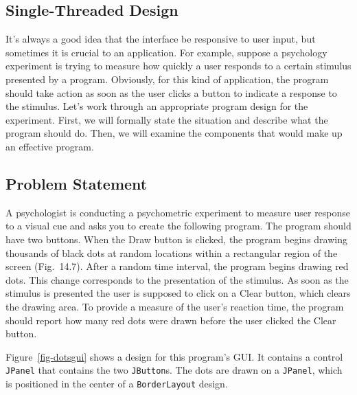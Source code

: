 \subsection{Single-Threaded Design}
\noindent It's always a good idea that the interface be responsive to
user input, but sometimes it is crucial to an application.  For
example, suppose a psychology experiment is trying to measure how
quickly a user responds to a certain stimulus presented by a program.
Obviously, for this kind of application, the program should take
action as soon as the user clicks a button to indicate a response to
the stimulus. Let's work through an appropriate program design for
the experiment. First, we will formally state the situation and
describe what the program should do.  Then, we will examine the
components that would make up an effective program.

\subsection*{Problem Statement}
\noindent A psychologist is conducting a psychometric experiment to measure user
response to a visual cue and asks you to create the following
program.  The program should have two buttons.  When the Draw button
is clicked, the program begins drawing thousands of black dots at
random locations within a rectangular region of the screen
(Fig.~14.7).  After a random time interval, the
program begins drawing red dots.  This change corresponds to the
presentation of the stimulus.  As soon as the stimulus is presented
the user is supposed to click on a Clear button, which clears the
drawing area.  To provide a measure of the user's reaction time, the
program should report how many red dots were drawn before the user
clicked the Clear button.

\pagebreak
Figure~\ref{fig-dotsgui} shows a design for this program's GUI.
It contains a control {\tt JPanel} that contains the two
{\tt JButton}s.  The dots are drawn on a {\tt JPanel}, which is
positioned in the center of a {\tt BorderLayout} design. 

